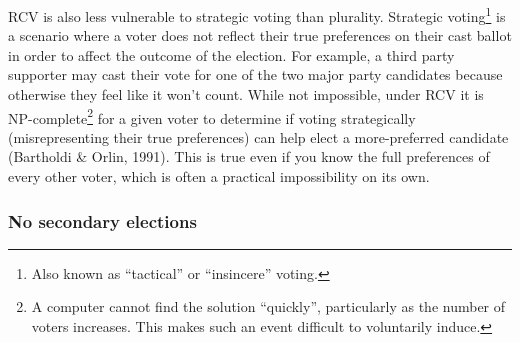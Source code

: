 \documentclass[12pt,twoside]{reedthesis}
\begin{document}
RCV is also less vulnerable to strategic voting than plurality. Strategic voting\footnote{Also known as ``tactical'' or ``insincere'' voting.} is a scenario where a voter does not reflect their true preferences on their cast ballot in order to affect the outcome of the election. For example, a third party supporter may cast their vote for one of the two major party candidates because otherwise they feel like it won't count. While not impossible, under RCV it is NP-complete\footnote{A computer cannot find the solution ``quickly'', particularly as the number of voters increases. This makes such an event difficult to voluntarily induce.} for a given voter to determine if voting strategically (misrepresenting their true preferences) can help elect a more-preferred candidate (Bartholdi \& Orlin, 1991). This is true even if you know the full preferences of every other voter, which is often a practical impossibility on its own.

\hypertarget{no-secondary-elections}{%
\subsubsection{No secondary elections}\label{no-secondary-elections}}
\end{document}
